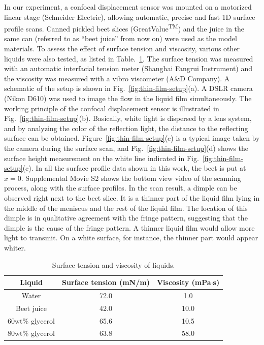 \documentclass[aps,prfluids,amsmath,amssymb,superscriptaddress,longbibliography]{revtex4-2}
\begin{document}
In our experiment, a confocal displacement sensor was mounted on a motorized linear stage  (Schneider Electric), allowing automatic, precise and fast 1D surface profile scans. 
Canned pickled beet slices (GreatValue\textsuperscript{TM}) and the juice in the same can (referred to as ``beet juice'' from now on) were used as the model materials. 
To assess the effect of surface tension and viscosity, various other liquids were also tested, as listed in Table.~\ref{tab:liquids}.
The surface tension was measured with an automatic interfacial tension meter (Shanghai Fangrui Instrument) and the viscosity was measured with a vibro viscometer (A\&D Company).
A schematic of the setup is shown in Fig.~\ref{fig:thin-film-setup}(a). 
A DSLR camera (Nikon D610) was used to image the flow in the liquid film simultaneously. 
The working principle of the confocal displacement sensor is illustrated in Fig.~\ref{fig:thin-film-setup}(b). 
Basically, white light is dispersed by a lens system, and by analyzing the color of the reflection light, the distance to the reflecting surface can be obtained.
Figure~\ref{fig:thin-film-setup}(c) is a typical image taken by the camera during the surface scan, and Fig.~\ref{fig:thin-film-setup}(d) shows the surface height measurement on the white line indicated in Fig.~\ref{fig:thin-film-setup}(c). 
In all the surface profile data shown in this work, the beet is put at $x=0$.
Supplemental Movie S2 shows the bottom view video of the scanning process, along with the surface profiles.
In the scan result, a dimple can be observed right next to the beet slice. 
It is a thinner part of the liquid film lying in the middle of the meniscus and the rest of the liquid film. 
The location of this dimple is in qualitative agreement with the fringe pattern, suggesting that the dimple is the cause of the fringe pattern. 
A thinner liquid film would allow more light to transmit.
On a white surface, for instance, the thinner part would appear whiter. 

\begin{table}[htbp]
    \centering
    \begin{tabular}{ccc}    
        \hline
        Liquid & Surface tension (mN/m) & Viscosity (mPa$\cdot$s) \\
        \hline
        Water           & 72.0 & 1.0  \\
        Beet juice      & 42.0 & 10.0 \\
        60wt\% glycerol & 65.6 & 10.5 \\
        80wt\% glycerol & 63.8 & 58.0 \\
        \hline
    \end{tabular}
    \caption{Surface tension and viscosity of liquids.}
    \label{tab:liquids}
\end{table}
\end{document}
